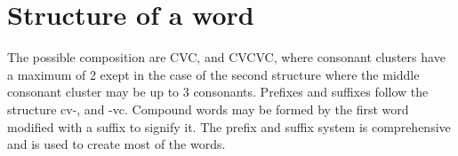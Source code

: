 \documentclass{book}
\begin{document}
\section{Structure of a word}
The possible composition are CVC, and CVCVC, where consonant clusters have a maximum of 2 exept in the case of the second structure where the middle consonant cluster may be up to 3 consonants.  Prefixes and suffixes follow the structure cv-, and -vc.  Compound words may be formed by the first word modified with a suffix to signify it.  The prefix and suffix system is comprehensive and is used to create most of the words.
\end{document}

